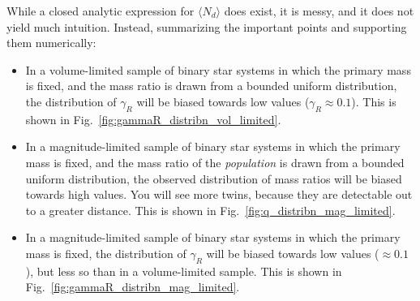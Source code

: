 \documentclass{emulateapj}
\begin{document}
While a closed analytic expression for $\langle N_d \rangle$ does exist, it is 
messy, and it does not yield much intuition. Instead, summarizing the important 
points and supporting them numerically:
\begin{itemize}
	\item In a volume-limited sample of binary star systems in which the 
	primary mass is fixed, and the mass ratio is drawn from a bounded uniform 
	distribution, the distribution of $\gamma_R$ will be biased towards low 
	values ($\gamma_R \approx 0.1$). This is shown in 
	Fig.~\ref{fig:gammaR_distribn_vol_limited}.
	\item In a magnitude-limited sample of binary star systems in which the 
	primary mass is fixed, and the mass ratio of the \textit{population} is 
	drawn from a bounded uniform distribution, the observed distribution of 
	mass ratios will be biased towards high values. You will see more twins,
  because they are detectable out to a greater distance. This is shown in 
	Fig.~\ref{fig:q_distribn_mag_limited}.
	\item In a magnitude-limited sample of binary star systems in which the 
	primary mass is fixed, the distribution of $\gamma_R$ will be biased 
	towards low values ($\approx 0.1$), but less so than in a 
	volume-limited sample. This is shown in 
	Fig.~\ref{fig:gammaR_distribn_mag_limited}.
\end{itemize}
\end{document}
